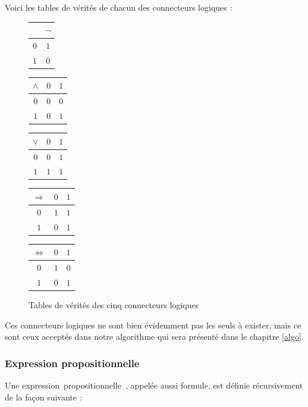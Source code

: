 \documentclass[a4paper, oneside]{report}
\newcommand{\expp}{expression~propositionnelle~}
\begin{document}
\newpage

Voici les tables de vérités de chacun des connecteurs logiques :
\begin{figure}[h]
\begin{center}
\begin{tabular}[t]{|c|c|}
\hline 
 & $\neg$ \\ 
\hline 
$0$ & $1$\\
$1$ & $0$ \\ 
\hline 
\end{tabular}
\hspace*{1em}
\begin{tabular}[t]{|c|cc|}
\hline 
$\wedge$ & $0$ & $1$ \\ 
\hline 
$0$ & $0$ & $0$\\
$1$ & $0$ & $1$ \\ 
\hline 
\end{tabular}
\hspace*{1em}
\begin{tabular}[t]{|c|cc|}
\hline 
$\vee$ & $0$ & $1$ \\ 
\hline 
$0$ & $0$ & $1$\\
$1$ & $1$ & $1$ \\ 
\hline 
\end{tabular}
\hspace*{1em}
\begin{tabular}[t]{|c|cc|}
\hline 
$\Rightarrow$ & $0$ & $1$ \\ 
\hline 
$0$ & $1$ & $1$\\
$1$ & $0$ & $1$ \\ 
\hline 
\end{tabular}
\hspace*{1em}
\begin{tabular}[t]{|c|cc|}
\hline 
$\Leftrightarrow$ & $0$ & $1$ \\ 
\hline 
$0$ & $1$ & $0$\\
$1$ & $0$ & $1$ \\ 
\hline 
\end{tabular}
\end{center}
\caption{Tables de vérités des cinq connecteurs logiques}
\end{figure}

Ces connecteurs logiques ne sont bien évidemment pas les seuls à exister, mais ce sont ceux acceptés dans notre algorithme qui sera présenté dans le chapitre \ref{algo}.

\subsubsection{Expression propositionnelle}
Une \expp, appelée aussi formule, est définie récursivement de la façon suivante :
\end{document}
